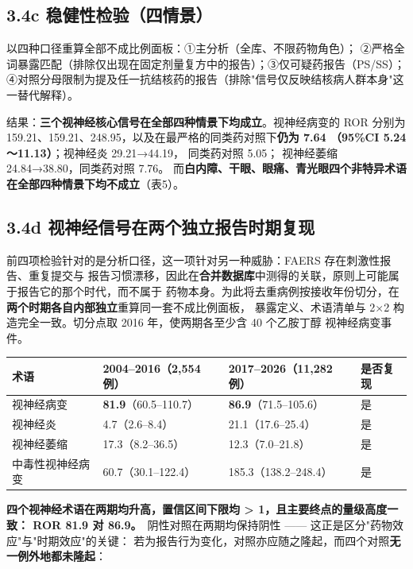 \documentclass[UTF8,fontset=windows,11pt]{ctexart}
\begin{document}
\subsection{3.4c 稳健性检验（四情景）}

以四种口径重算全部不成比例面板：①主分析（全库、不限药物角色）； ②严格全词暴露匹配（排除仅出现在固定剂量复方中的报告）；③仅可疑药报告（PS/SS）； ④对照分母限制为提及任一抗结核药的报告（排除"信号仅反映结核病人群本身"这一替代解释）。

结果：\textbf{三个视神经核心信号在全部四种情景下均成立}。视神经病变的 ROR 分别为 159.21、159.21、248.95，以及在最严格的同类药对照下\textbf{仍为 7.64 （95\%CI 5.24～11.13）}；视神经炎 29.21→44.19， 同类药对照 5.05； 视神经萎缩 24.84→38.80，同类药对照 7.76。 而\textbf{白内障、干眼、眼痛、青光眼四个非特异术语在全部四种情景下均不成立}（表5）。

\subsection{3.4d 视神经信号在两个独立报告时期复现}

前四项检验针对的是分析口径，这一项针对另一种威胁：FAERS 存在刺激性报告、重复提交与 报告习惯漂移，因此在\textbf{合并数据库}中测得的关联，原则上可能属于报告它的那个时代，而不属于 药物本身。为此将去重病例按接收年份切分，在\textbf{两个时期各自内部独立}重算同一套不成比例面板， 暴露定义、术语清单与 2×2 构造完全一致。切分点取 2016 年，使两期各至少含 40 个乙胺丁醇 视神经病变事件。

\begin{center}
\small
\begin{longtable}{p{}p{}p{}p{}}
\hline
术语 & 2004–2016（2,554 例） & 2017–2026（11,282 例） & 是否复现 \\
\hline
视神经病变 & \textbf{81.9}（60.5–110.7） & \textbf{86.9}（71.5–105.6） & 是 \\
视神经炎 & 4.7（2.6–8.4） & 21.1（17.6–25.4） & 是 \\
视神经萎缩 & 17.3（8.2–36.5） & 12.3（7.0–21.8） & 是 \\
中毒性视神经病变 & 60.7（30.1–122.4） & 185.3（138.2–248.4） & 是 \\
\hline
\end{longtable}
\end{center}

\textbf{四个视神经术语在两期均升高，置信区间下限均 > 1，且主要终点的量级高度一致： ROR 81.9 对 86.9。}\ 阴性对照在两期均保持阴性 —— 这正是区分"药物效应"与"时期效应"的关键： 若为报告行为变化，对照亦应随之隆起，而四个对照\textbf{无一例外地都未隆起}：
\end{document}
